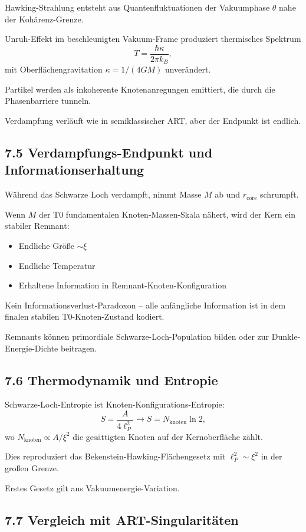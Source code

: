 \documentclass[12pt,a4paper]{article}
\begin{document}
	Hawking-Strahlung entsteht aus Quantenfluktuationen der Vakuumphase $\theta$ nahe der Kohärenz-Grenze.
	
	Unruh-Effekt im beschleunigten Vakuum-Frame produziert thermisches Spektrum
	\[
	T = \frac{\hbar \kappa}{2\pi k_B},
	\]
	mit Oberflächengravitation $\kappa = 1/(4GM)$ unverändert.
	
	Partikel werden als inkoherente Knotenanregungen emittiert, die durch die Phasenbarriere tunneln.
	
	Verdampfung verläuft wie in semiklassischer ART, aber der Endpunkt ist endlich.
	
	\subsection{7.5 Verdampfungs-Endpunkt und Informationserhaltung}
	
	Während das Schwarze Loch verdampft, nimmt Masse $M$ ab und $r_{\text{core}}$ schrumpft.
	
	Wenn $M$ der T0 fundamentalen Knoten-Massen-Skala nähert, wird der Kern ein stabiler Remnant:
	\begin{itemize}
		\item Endliche Größe $\sim \xi$
		\item Endliche Temperatur
		\item Erhaltene Information in Remnant-Knoten-Konfiguration
	\end{itemize}
	
	Kein Informationsverlust-Paradoxon – alle anfängliche Information ist in dem finalen stabilen T0-Knoten-Zustand kodiert.
	
	Remnants können primordiale Schwarze-Loch-Population bilden oder zur Dunkle-Energie-Dichte beitragen.
	
	\subsection{7.6 Thermodynamik und Entropie}
	
	Schwarze-Loch-Entropie ist Knoten-Konfigurations-Entropie:
	\[
	S = \frac{A}{4 \ell_P^2} \to S = N_{\text{knoten}} \ln 2,
	\]
	wo $N_{\text{knoten}} \propto A / \xi^2$ die gesättigten Knoten auf der Kernoberfläche zählt.
	
	Dies reproduziert das Bekenstein-Hawking-Flächengesetz mit $\ell_P^2 \sim \xi^2$ in der großen Grenze.
	
	Erstes Gesetz gilt aus Vakuumenergie-Variation.
	
	\subsection{7.7 Vergleich mit ART-Singularitäten}
	
\end{document}

